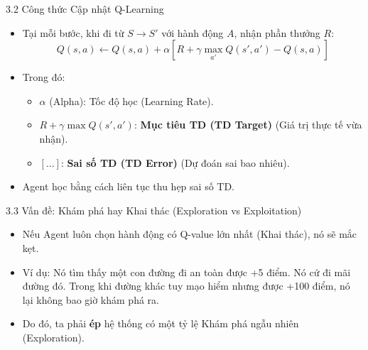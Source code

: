 \documentclass[aspectratio=169, 12pt]{beamer}
\begin{document}
\begin{frame}{3.2 Công thức Cập nhật Q-Learning}
    \begin{itemize}
        \item Tại mỗi bước, khi đi từ $S \rightarrow S'$ với hành động $A$, nhận phần thưởng $R$:
        $$ Q(s, a) \leftarrow Q(s, a) + \alpha \left[ R + \gamma \max_{a'} Q(s', a') - Q(s, a) \right] $$
        \item Trong đó:
            \begin{itemize}
                \item $\alpha$ (Alpha): Tốc độ học (Learning Rate).
                \item $R + \gamma \max Q(s', a')$: \textbf{Mục tiêu TD (TD Target)} (Giá trị thực tế vừa nhận).
                \item $\left[ \dots \right]$: \textbf{Sai số TD (TD Error)} (Dự đoán sai bao nhiêu).
            \end{itemize}
        \item Agent học bằng cách liên tục thu hẹp sai số TD.
    \end{itemize}
\end{frame}

\begin{frame}{3.3 Vấn đề: Khám phá hay Khai thác (Exploration vs Exploitation)}
    \begin{itemize}
        \item Nếu Agent luôn chọn hành động có Q-value lớn nhất (Khai thác), nó sẽ mắc kẹt.
        \item Ví dụ: Nó tìm thấy một con đường đi an toàn được +5 điểm. Nó cứ đi mãi đường đó. Trong khi đường khác tuy mạo hiểm nhưng được +100 điểm, nó lại không bao giờ khám phá ra.
        \item Do đó, ta phải \textbf{ép} hệ thống có một tỷ lệ Khám phá ngẫu nhiên (Exploration).
    \end{itemize}
\end{frame}
\end{document}
